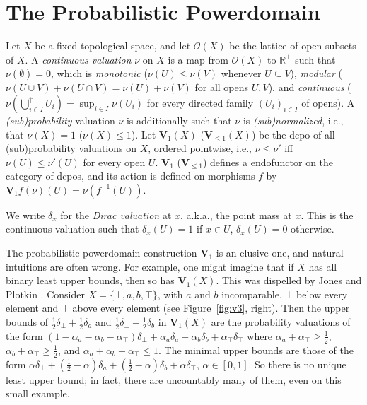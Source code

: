 \documentclass{LMCS}
\newcommand\Open{\mathcal O}
\newcommand\Val{\mathbf V}
\newcommand{\real}{\mathbb{R}}
\begin{document}
\section{The Probabilistic Powerdomain}
\label{sec:qretr:V}

Let $X$ be a fixed topological space, and let $\Open (X)$ be the
lattice of open subsets of $X$.
A {\em continuous valuation\/} $\nu$ on $X$ \cite{JP:proba} is a map
from $\Open (X)$ to $\real^+$ such that $\nu (\emptyset)=0$, which is
{\em monotonic\/} ($\nu (U) \leq \nu (V)$ whenever $U \subseteq V$),
{\em modular\/} ($\nu (U \cup V) + \nu (U \cap V) = \nu (U) + \nu (V)$
for all opens $U, V$), and {\em continuous\/} ($\nu (\bigcup_{i \in
  I}^\uparrow U_i)= \sup_{i \in I} \nu (U_i)$ for every directed
family ${(U_i)}_{i \in I}$ of opens).  A {\em (sub)probability\/}
valuation $\nu$ is additionally such that $\nu$ is {\em
  (sub)normalized\/}, i.e., that $\nu (X)=1$ ($\nu (X) \leq 1$).  Let
$\Val_1 (X)$ ($\Val_{\leq 1} (X)$) be the dcpo of all (sub)probability
valuations on $X$, ordered pointwise, i.e., $\nu \leq \nu'$ iff $\nu
(U) \leq \nu' (U)$ for every open $U$.  $\Val_1$ ($\Val_{\leq 1}$)
defines a endofunctor on the category of dcpos, and its action is
defined on morphisms $f$ by $\Val_1 f (\nu) (U) = \nu (f^{-1} (U))$.

We write $\delta_x$ for the \emph{Dirac valuation} at $x$, a.k.a., the
point mass at $x$.  This is the continuous valuation such that
$\delta_x (U)=1$ if $x \in U$, $\delta_x (U) = 0$ otherwise.

The probabilistic powerdomain construction $\Val_1$ is an elusive one,
and natural intuitions are often wrong.  For example, one might
imagine that if $X$ has all binary least upper bounds, then so has
$\Val_1 (X)$.  This was dispelled by Jones and Plotkin
\cite{JP:proba}.  Consider $X = \{\bot, a, b, \top\}$, with $a$ and
$b$ incomparable, $\bot$ below every element and $\top$ above every
element (see Figure~\ref{fig:v3}, right).  Then the upper bounds of
$\frac 1 2 \delta_\bot + \frac 1 2 \delta_a$ and $\frac 1 2
\delta_\bot + \frac 1 2 \delta_b$ in $\Val_1 (X)$ are the probability
valuations of the form $(1 - \alpha_a - \alpha_b - \alpha_\top)
\delta_\bot + \alpha_a \delta_a + \alpha_b \delta_b + \alpha_\top
\delta_\top$ where $\alpha_a + \alpha_\top \geq \frac 1 2$, $\alpha_b
+ \alpha_\top \geq \frac 1 2$, and $\alpha_a + \alpha_b + \alpha_\top
\leq 1$.  The minimal upper bounds are those of the form $\alpha
\delta_\bot + (\frac 1 2 - \alpha) \delta_a + (\frac 1 2 - \alpha)
\delta_b + \alpha \delta_\top$, $\alpha \in [0,1]$.  So there is no
unique least upper bound; in fact, there are uncountably many of them,
even on this small example.
\end{document}
